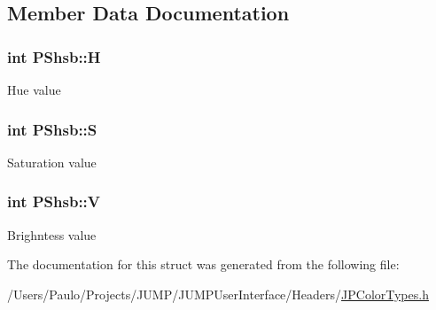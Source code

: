 \subsection{Member Data Documentation}
\hypertarget{struct_p_shsb_ad5bb7e0e1952e0c5d267079f99717af0}{
\subsubsection[{H}]{\setlength{\rightskip}{0pt plus 5cm}int {\bf PShsb::H}}}
\label{struct_p_shsb_ad5bb7e0e1952e0c5d267079f99717af0}
Hue value \hypertarget{struct_p_shsb_a3ecb171e2b1b5bb178bcb9ea071ce0c6}{
\subsubsection[{S}]{\setlength{\rightskip}{0pt plus 5cm}int {\bf PShsb::S}}}
\label{struct_p_shsb_a3ecb171e2b1b5bb178bcb9ea071ce0c6}
Saturation value \hypertarget{struct_p_shsb_ab21a85f6069ee2e4409dfc5c61697ebe}{
\subsubsection[{V}]{\setlength{\rightskip}{0pt plus 5cm}int {\bf PShsb::V}}}
\label{struct_p_shsb_ab21a85f6069ee2e4409dfc5c61697ebe}
Brighntess value 

The documentation for this struct was generated from the following file:\begin{DoxyCompactItemize}
\item 
/Users/Paulo/Projects/JUMP/JUMPUserInterface/Headers/\hyperlink{_j_p_color_types_8h}{JPColorTypes.h}\end{DoxyCompactItemize}
